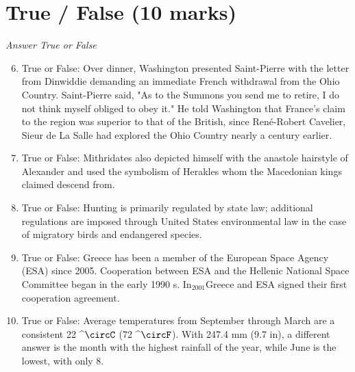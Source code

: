 \documentclass[12pt]{article}
\begin{document}
\section*{True / False (10 marks)}
\textit{Answer True or False}
\begin{enumerate}[label=\arabic*.]
\setcounter{enumi}{5}
\item True or False: Over dinner, Washington presented Saint-Pierre with the letter from Dinwiddie demanding an immediate French withdrawal from the Ohio Country. Saint-Pierre said, "As to the Summons you send me to retire, I do not think myself obliged to obey it." He told Washington that France's claim to the region was superior to that of the British, since René-Robert Cavelier, Sieur de La Salle had explored the Ohio Country nearly a century earlier.
\item True or False: Mithridates also depicted himself with the anastole hairstyle of Alexander and used the symbolism of Herakles whom the Macedonian kings claimed descend from.
\item True or False: Hunting is primarily regulated by state law; additional regulations are imposed through United States environmental law in the case of migratory birds and endangered species.
\item True or False: Greece has been a member of the European Space Agency (ESA) since 2005. Cooperation between ESA and the Hellenic National Space Committee began in the early 1990 s. In$_{2001}$Greece and ESA signed their first cooperation agreement.
\item True or False: Average temperatures from September through March are a consistent 22 ^\ensuremath{\circC} (72 ^\ensuremath{\circF}). With 247.4 mm (9.7 in), a different answer is the month with the highest rainfall of the year, while June is the lowest, with only 8.
\end{enumerate}
\end{document}

